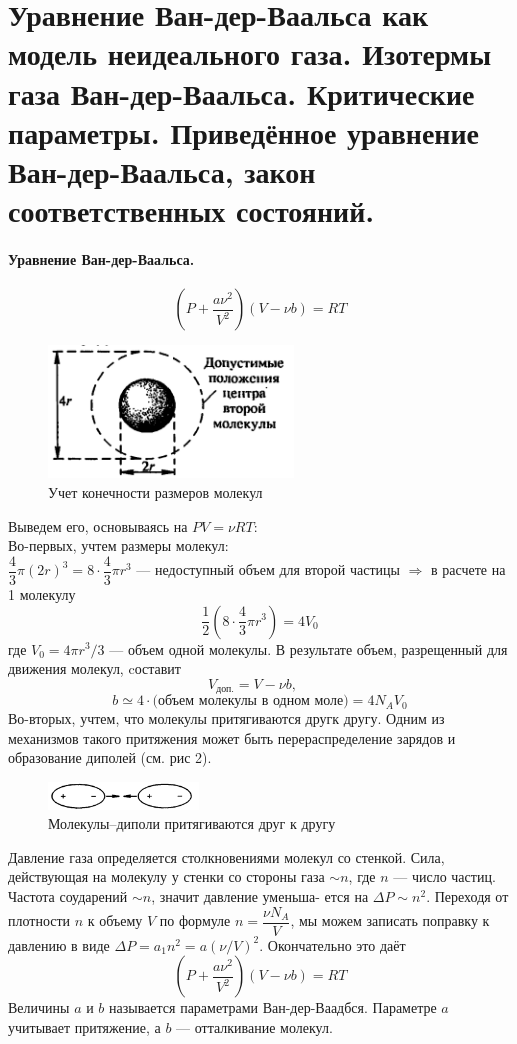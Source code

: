 \section{\normalsize Уравнение Ван-дер-Ваальса как модель неидеального газа. Изотермы газа Ван-дер-Ваальса. Критические параметры. Приведённое уравнение Ван-дер-Ваальса, закон соответственных состояний.}
\paragraph{Уравнение Ван-дер-Ваальса.}
$$\left(P+\dfrac{a\nu^2}{V^2}\right)\left(V-\nu b\right)=RT$$

\begin{figure}
	\includegraphics[width=65mm]{ris19.png}
	\caption{Учет конечности размеров молекул}
\end{figure}
Выведем его, основываясь на $PV=\nu RT$:\\
Во-первых, учтем размеры молекул: \\$\dfrac{4}{3}\pi(2r)^3=8\cdot\dfrac{4}{3}\pi r^3$ --- недоступный объем для второй частицы $\Rightarrow$ в расчете на 1 молекулу $$\dfrac{1}{2}(8\cdot\dfrac{4}{3}\pi r^3)=4V_0$$
где $V_0=4\pi r^3/3$ --- объем одной молекулы. 
В результате объем, разрещенный для движения молекул, cоставит
$$V_\text{доп.} =V-\nu b,\quad$$
$$ b\simeq4\cdot\text{(объем молекулы в одном моле)}=4N_AV_0$$
Во-вторых, учтем, что молекулы притягиваются другк другу. Одним из механизмов такого притяжения может быть перераспределение зарядов и образование диполей (см. рис 2).

\begin{figure}
	\label{dipol}
	\includegraphics[width=40mm]{ris19_2.png}
	\caption{\small Молекулы--диполи притягиваются друг к другу}
\end{figure}
Давление газа определяется столкновениями молекул со стенкой. Сила, действующая на молекулу у стенки со стороны газа $\sim n$, где $n$ --- число частиц. Частота соударений $\sim n$, значит давление уменьша-
ется на $\Delta P\sim n^2$. Переходя от плотности $n$ к объему $V$ по формуле $n=\dfrac{\nu N_A}{V}$, мы можем записать поправку к давлению в виде $\Delta P=a_1n^2=a(\nu/V)^2.$ Окончательно это даёт
$$\left(P+\dfrac{a\nu^2}{V^2}\right)\left(V-\nu b\right)=RT$$
Величины $a$ и $b$ называется параметрами Ван-дер-Ваадбся. Параметре $a$ учитывает притяжение, а $b$ --- отталкивание молекул.
